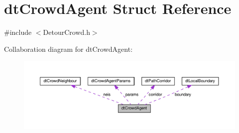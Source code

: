 \hypertarget{structdtCrowdAgent}{}\section{dt\+Crowd\+Agent Struct Reference}
\label{structdtCrowdAgent}


{\ttfamily \#include $<$Detour\+Crowd.\+h$>$}



Collaboration diagram for dt\+Crowd\+Agent\+:
\nopagebreak
\begin{figure}[H]
\begin{center}
\leavevmode
\includegraphics[width=350pt]{structdtCrowdAgent__coll__graph}
\end{center}
\end{figure}
